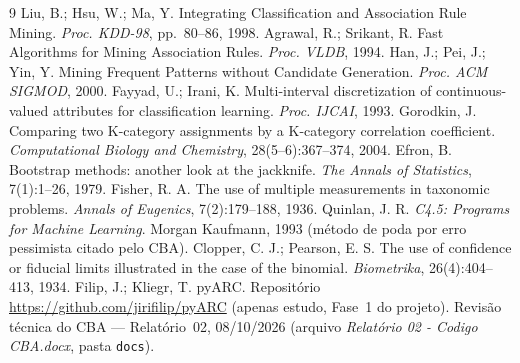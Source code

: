 \documentclass[a4paper,11pt]{article}
\begin{document}
\begin{thebibliography}{9}
 Liu, B.; Hsu, W.; Ma, Y. Integrating Classification and Association Rule Mining. \emph{Proc. KDD-98}, pp.\ 80--86, 1998.
 Agrawal, R.; Srikant, R. Fast Algorithms for Mining Association Rules. \emph{Proc. VLDB}, 1994.
 Han, J.; Pei, J.; Yin, Y. Mining Frequent Patterns without Candidate Generation. \emph{Proc. ACM SIGMOD}, 2000.
 Fayyad, U.; Irani, K. Multi-interval discretization of continuous-valued attributes for classification learning. \emph{Proc. IJCAI}, 1993.
 Gorodkin, J. Comparing two K-category assignments by a K-category correlation coefficient. \emph{Computational Biology and Chemistry}, 28(5--6):367--374, 2004.
 Efron, B. Bootstrap methods: another look at the jackknife. \emph{The Annals of Statistics}, 7(1):1--26, 1979.
 Fisher, R. A. The use of multiple measurements in taxonomic problems. \emph{Annals of Eugenics}, 7(2):179--188, 1936.
 Quinlan, J. R. \emph{C4.5: Programs for Machine Learning}. Morgan Kaufmann, 1993 (m\'etodo de poda por erro pessimista citado pelo CBA).
 Clopper, C. J.; Pearson, E. S. The use of confidence or fiducial limits illustrated in the case of the binomial. \emph{Biometrika}, 26(4):404--413, 1934.
 Filip, J.; Kliegr, T. pyARC. Reposit\'orio \url{https://github.com/jirifilip/pyARC} (apenas estudo, Fase~1 do projeto).
 Revis\~ao t\'ecnica do CBA --- Relat\'orio~02, 08/10/2026 (arquivo \emph{Relat\'orio 02 - Codigo CBA.docx}, pasta \texttt{docs}).
\end{thebibliography}
\end{document}
